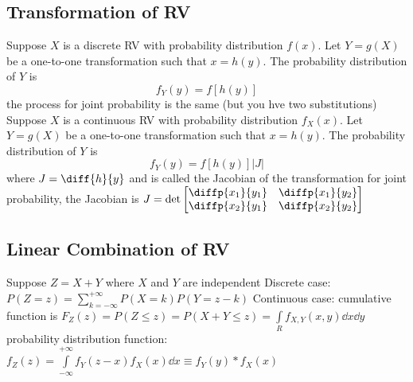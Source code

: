 \documentclass[a4paper,11pt]{article}
\begin{document}
	\subsection{Transformation of RV}
	\begin{outline}[enumerate]
		\1 Suppose $X$ is a discrete RV with probability distribution $f\left(x\right)$. Let $Y = g\left(X\right)$ be a one-to-one transformation such that $x = h\left(y\right)$. The probability distribution of $Y$ is
			\begin{equation}
				f_{Y}\left(y\right) = f\left[h\left(y\right)\right]		
			\end{equation}
		\1 the process for joint probability is the same (but you hve two substitutions)
		\1 Suppose $X$ is a continuous RV with probability distribution $f_{X}\left(x\right)$. Let $Y = g\left(X\right)$ be a one-to-one transformation such that $x = h\left(y\right)$. The probability distribution of $Y$ is 
			\begin{equation}
				f_{Y}\left(y\right) = f\left[h\left(y\right)\right]\lvert J\rvert	
			\end{equation}
		where $J = \diff{h}{y}$	and is called the Jacobian of the transformation
		\1 for joint probability, the Jacobian is $J = \det\begin{bmatrix}
		\diffp{x_{1}}{{y_{1}}} & \diffp{x_{1}}{{y_{2}}} \\ 
		\diffp{x_{2}}{{y_{1}}} & \diffp{x_{2}}{{y_{2}}}
		\end{bmatrix}$
	\end{outline}
	\subsection{Linear Combination of RV}
	\begin{outline}[enumerate]
		\1 Suppose $Z = X + Y$ where $X$ and $Y$ are independent
			\2 Discrete case:
				\3 $P\left(Z = z\right) = \sum\limits_{k = -\infty}^{+\infty} P\left(X = k\right) P\left(Y = z - k\right)$
			\2 Continuous case:	
				\3 cumulative function is $F_{Z}\left(z\right) = P\left(Z \leq z\right) = P\left(X + Y \leq z\right) = \int\limits_{R} f_{X, Y}\left(x, y\right) \dd x \dd y$
				\3 probability distribution function: $f_{Z}\left(z\right) = \int\limits_{-\infty}^{+\infty} f_{Y}\left(z - x\right)f_{X}\left(x\right) \dd x \equiv f_{Y}\left(y\right) * f_{X}\left(x\right)$
	\end{outline}
\end{document}
